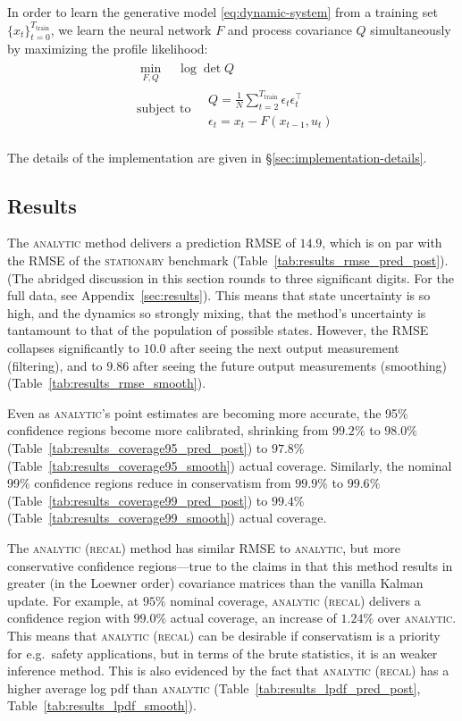 \documentclass{article} %
\begin{document}
In order to learn the generative model \ref{eq:dynamic-system} from a
training set \(\{x_t\}_{t =0}^{T_\text{train}}\),
we learn the neural network \(F\) and process
covariance \(Q\) simultaneously by maximizing the profile likelihood:
\begin{align}
\label{eq:profile-likelihood}
  \begin{split}
    &\min_{F, Q}
    \quad
    \log \det Q
    \\
    &\text{subject to}
    \quad
    \begin{matrix}
      Q = \frac{1}{N} \sum_{t=2}^{T_\text{train}} \epsilon_t
      \epsilon_t^\intercal\\
      \epsilon_t = x_t - F(x_{t-1}, u_t)
    \end{matrix}
  \end{split}
\end{align}

The details of the implementation are given in \S\ref{sec:implementation-details}.
\subsection{Results}
The \textsc{analytic} method delivers a prediction RMSE of \(14.9\), which is on par with the RMSE of the \textsc{stationary} benchmark (Table~\ref{tab:results_rmse_pred_post}).
(The abridged discussion in this section rounds to three significant digits. For the full data, see Appendix~\ref{sec:results}).
This means that state uncertainty is so high, and the dynamics so strongly mixing, that the method's uncertainty is tantamount to that of the population of possible states.
However, the RMSE collapses significantly to \(10.0\) after seeing the next output measurement (filtering),
and to \(9.86\) after seeing the future output measurements (smoothing) (Table~\ref{tab:results_rmse_smooth}).

Even as \textsc{analytic}'s point estimates are becoming more accurate, the 95\% confidence regions become more calibrated, shrinking from \(99.2\%\) to \(98.0\%\) (Table~\ref{tab:results_coverage95_pred_post}) to \(97.8\%\) (Table~\ref{tab:results_coverage95_smooth}) actual coverage.
Similarly, the nominal 99\% confidence regions reduce in conservatism from \(99.9\%\) to \(99.6\%\) (Table~\ref{tab:results_coverage99_pred_post}) to \(99.4\%\) (Table~\ref{tab:results_coverage99_smooth}) actual coverage.

The \textsc{analytic (recal)} method has similar RMSE to \textsc{analytic}, but more conservative confidence regions---true to the claims in \citet{jiang_new_2025} that this method results in greater (in the Loewner order) covariance matrices than the vanilla Kalman update.
For example, at \(95\%\) nominal coverage, \textsc{analytic (recal)} delivers a confidence region with \(99.0\%\) actual coverage, an increase of \(1.24\%\) over \textsc{analytic}.
This means that \textsc{analytic (recal)} can be desirable if conservatism is a priority for e.g.~safety applications, but in terms of the brute statistics, it is an weaker inference method.
This is also evidenced by the fact that \textsc{analytic (recal)} has a higher average log pdf than  \textsc{analytic} (Table~\ref{tab:results_lpdf_pred_post}, Table~\ref{tab:results_lpdf_smooth}).
\end{document}
